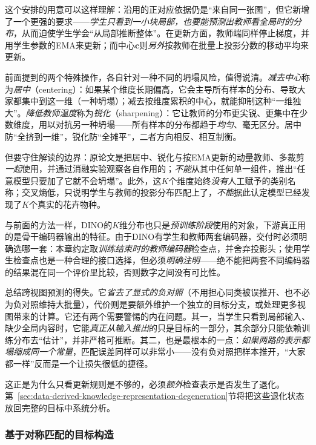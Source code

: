 这个安排的用意可以这样理解：沿用的正对应依据仍是“来自同一张图”，但它新增了一个更强的要求——\emph{学生只看到一小块局部，也要能预测出教师看全局时的分布}，从而迫使学生学会“从局部推断整体”。在更新方面，教师端同样停止梯度，并用学生参数的EMA来更新；而中心$\bm{c}$则\emph{另外}按教师在批量上投影分数的移动平均来更新。

前面提到的两个特殊操作，各自针对一种不同的坍塌风险，值得说清。\emph{减去中心}称为\emph{居中}（centering）：如果某个维度长期偏高，它会主导所有样本的分布、导致大家都集中到这一维（一种坍塌）；减去按维度累积的中心，就能抑制这种“一维独大”。\emph{降低教师温度}称为\emph{锐化}（sharpening）：它让教师的分布更尖锐、更集中在少数维度，用以对抗另一种坍塌——所有样本的分布都趋于\emph{均匀}、毫无区分。居中防“全挤到一维”，锐化防“全摊平”，二者方向相反、相互制衡。

但要守住解读的边界：原论文是把居中、锐化与按EMA更新的动量教师、多裁剪\emph{一起}使用，并通过消融实验观察各自作用的；\emph{不能}从其中任何单一组件，推出“任意模型只要加了它就不会坍塌”。此外，这$K$个维度始终\emph{没有}人工赋予的类别名称；交叉熵低，只说明学生与教师的投影分布匹配上了，\emph{不能}据此认定模型已经发现了$K$个真实的花卉物种。

与前面的方法一样，DINO的$K$维分布也只是\emph{预训练阶段}使用的对象，下游真正用的是骨干编码器输出的特征。由于DINO有学生和教师两套编码器，交付时必须明确选哪一套：本章约定取\emph{训练结束时的教师编码器}检查点，并舍弃投影头；使用学生检查点也是一种合理的接口选择，但必须\emph{明确注明}——绝不能把两套不同编码器的结果混在同一个评价里比较，否则数字之间没有可比性。

总结跨视图预测的得失。它\emph{省去了显式的负对照}（不用担心同类被误推开、也不必为负对照维持大批量），代价则是要额外维护一个独立的目标分支，或处理更多视图带来的计算。它还有两个需要警惕的内在问题。其一，当学生只看到局部输入、缺少全局内容时，它能\emph{真正从输入推出}的只是目标的一部分，其余部分只能依赖训练分布去“估计”，并非严格可推断。其二，也是最根本的一点：\emph{如果两路的表示都塌缩成同一个常量}，匹配误差同样可以非常小——没有负对照把样本推开，“大家都一样”反而是一个让损失很低的捷径。

这正是为什么只看更新规则是不够的，必须\emph{额外}检查表示是否发生了退化。第~\ref{sec:data-derived-knowledge-representation-degeneration}节将把这些退化状态放回完整的目标中系统分析。

\subsubsection{基于对称匹配的目标构造}
\label{sec:data-derived-knowledge-symmetric-matching}

